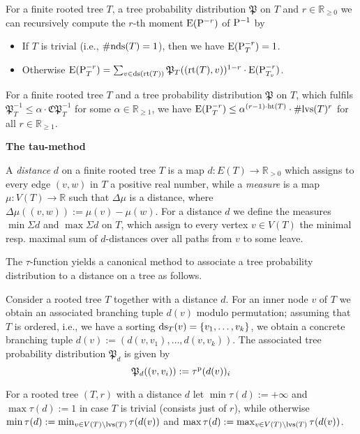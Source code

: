 \documentclass{report}
\def\p{{\rm p}}
\def\E{{\rm E}}
\def\P{{\rm P}}
\begin{document}
\begin{enumerate}
			
			{\lem For a finite rooted tree $T$, a tree probability distribution $\mathfrak{P}$ on $T$
				and $r \in \mathbb{R}_{\geq 0}$ we can recursively compute the $r$-th moment $\E(\P^{-r} )$ of $\P^{-1}$ by
				\begin{itemize}
					\item If $T$ is trivial (i.e., $\#{\rm nds}(T) = 1$), then we have $\E(\P^{-r}_T) = 1$.
					\item Otherwise $\E(\P^{-r}_T) =\sum_{v\in {\rm ds}({\rm rt}(T))} \mathfrak{P}_T (({\rm rt}(T),v))^{1-r}\cdot \E(\P^{-r}_{T_v} )$.
				\end{itemize}}
				
				
				{\lem For a finite rooted tree $T$ and a tree probability distribution $\mathfrak{P}$
					on $T$, which fulfils $\mathfrak{P}^{-1}_T\leq \alpha \cdot \mathfrak{CP}^{-1}_T$
					for some $\alpha \in \mathbb{R}_{\geq 1}$, we have $\E(\P^{-r}_T) \leq
					\alpha^{(r-1)\cdot {\rm ht}(T)} \cdot \#{\rm lvs}(T)^r$ for all $r \in \mathbb{R}_{\geq 1}$.}
				
				{\bf The tau-method}
				
				{ A {\it distance} $d$ on a finite rooted tree $T$ is a map $d : E(T) \to  \mathbb{R}_{>0}$
					which assigns to every edge $(v,w)$ in $T$ a positive real number, while a {\it measure} is
					a map $\mu : V (T) \to \mathbb{R}$ such that $\Delta \mu$ is a distance, where $\Delta \mu ((v,w)) := \mu (v)-\mu (w)$.
					For a distance $ d$ we define the measures $\min \Sigma d$ and $\max \Sigma d$ on $T$, which assign
					to every vertex $v \in V (T)$ the minimal resp. maximal sum of $d$-distances over all
					paths from $v$ to some leave.}
				
				The $\tau $-function yields a canonical method to associate a tree probability distribution to a distance on a tree as follows.
				
				{ Consider a rooted tree $T$ together with a distance $d$. For an
					inner node $v$ of $T$ we obtain an associated branching tuple $d(v)$ modulo permutation; assuming that $T$ is ordered, i.e., we have a sorting ${\rm ds} _T (v) = \{v_1 ,\ldots,v_k\}$, we
					obtain a concrete branching tuple $d(v) := (d(v,v_1 ),\ldots,d(v,v_k))$. The associated
					tree probability distribution $\mathfrak{P}_ d$ is given by
					\[
					\mathfrak{P} _d ((v,v _i )) := \tau^\p (d(v))_ i
					\]}
				
				
				{ For a rooted tree $(T,r)$ with a distance $d$ let $\min\tau (d) :=
					+\infty$ and $\max\tau (d) := 1$ in case $T$ is trivial (consists just of $r$), while otherwise
					$\min\tau (d) := \min _{v\in V (T)\backslash{\rm lvs}(T)} \tau (d(v))$ and $\max\tau (d) := \max _{v\in V (T)\backslash{\rm lvs}(T)} \tau (d(v))$.}
				

\end{enumerate}
\end{document}
